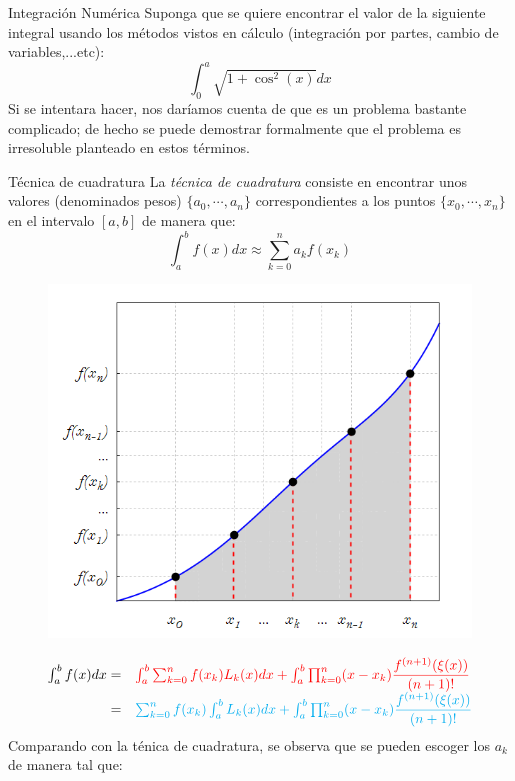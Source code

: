 \begin{frame}[allowframebreaks]{Integración Numérica}
\indent Suponga que se quiere encontrar el valor de la siguiente integral usando los métodos vistos en cálculo (integración por partes, cambio de variables,...etc):
$$\int_{0}^{a}\sqrt{1+\cos^2(x)}dx$$
\indent Si se intentara hacer, nos daríamos cuenta de que es un problema bastante complicado; de hecho se puede demostrar formalmente que el problema es irresoluble planteado en estos términos. 
\begin{block}{Técnica de cuadratura}
La \textit{técnica de cuadratura}  consiste en encontrar unos valores (denominados pesos) $\{a_0,\cdots,a_n\}$ correspondientes a los puntos $\{x_0,\cdots, x_n\}$ en el intervalo $[a,b]$  de manera que: 
$$\int_{a}^{b}f(x)dx\approx \sum_{k=0}^{n}a_kf(x_k)$$
\end{block}
\begin{figure}[H]
\centering
\includegraphics[scale=0.6]{Imagen62}
\end{figure}
\begin{displaymath}
\begin{array}{rl}
\int_a^b f(x)dx=&\textcolor{red}{\int_a^b\sum_{k=0}^n f(x_k)L_k(x)dx+\int_a^b\prod_{k=0}^{n}(x-x_k)\dfrac{f^{(n+1)}(\xi(x))}{(n+1)!}}\\
=&\textcolor{cyan}{\sum_{k=0}^n f(x_k)\int_a^b L_k(x)dx+\int_a^b\prod_{k=0}^{n}(x-x_k)\dfrac{f^{(n+1)}(\xi(x))}{(n+1)!}}
\end{array}
\end{displaymath}
\indent Comparando con la ténica de cuadratura, se observa que se pueden escoger los $a_k$ de manera tal que: 

\end{frame}
